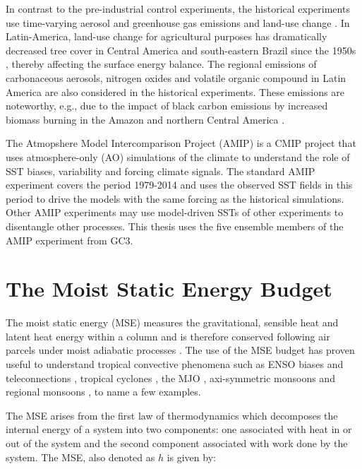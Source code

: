 In contrast to the pre-industrial control experiments, the historical experiments use  time-varying aerosol and greenhouse gas emissions and land-use change \citep{eyring2016}. In Latin-America, land-use change for agricultural purposes has dramatically decreased tree cover in Central America and south-eastern Brazil since the 1950s \citep{lawrence2012}, thereby affecting the surface energy balance. %
The regional emissions of carbonaceous aerosols, nitrogen oxides and volatile organic compound in Latin America are also considered in the historical experiments. These emissions are noteworthy, e.g., due to the impact of black carbon emissions by increased biomass burning in the Amazon and northern Central America \citep{chuvieco2008}.  


The Atmopshere Model Intercomparison Project (AMIP) is a CMIP project that uses atmosphere-only (AO) simulations of the climate to understand the role of SST biases, variability and forcing climate signals. The standard AMIP experiment covers the period 1979-2014 and uses the observed SST fields in this period to drive the models with the same forcing as the historical simulations. Other AMIP experiments may use model-driven SSTs of other experiments to disentangle other processes.  This thesis uses the five ensemble members of the AMIP experiment from GC3. 



\section{The Moist Static Energy Budget}\label{sq:msemethod}

The moist static energy (MSE) measures the gravitational, sensible heat and latent heat energy within a column and is therefore conserved following air parcels under moist adiabatic processes \citep{neelin2005,back2006,ma2019}. The use of the MSE budget has proven useful to understand tropical convective phenomena such as ENSO biases \citep{annamalai2020} and teleconnections \citep{neelin2005}, tropical cyclones \citep[e.g.][]{wing2019}, the MJO \citep{inoue2015}, axi-symmetric monsoons \citep[e.g.][]{bordoni2008monsoons} and regional monsoons \citep[e.g.][]{smyth2018simulated,ma2019}, to name a few examples. 

The MSE arises from the first law of thermodynamics which decomposes the internal energy of a system into two components: one associated with heat in or out of the system and the second component associated with work done by the system. 
The MSE, also denoted as $h$ is given by:


